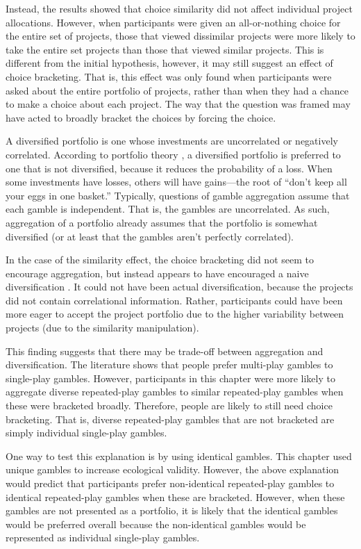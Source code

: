 \documentclass[a4paper, nobind]{templates/ociamthesis}
\theoremstyle{definition}
\theoremstyle{definition}
\theoremstyle{definition}
\theoremstyle{definition}
\theoremstyle{remark}
\begin{document}
Instead, the results showed that choice similarity did not affect individual
project allocations. However, when participants were given an all-or-nothing
choice for the entire set of projects, those that viewed dissimilar projects
were more likely to take the entire set projects than those that viewed similar
projects. This is different from the initial hypothesis, however, it may still
suggest an effect of choice bracketing. That is, this effect was only found when
participants were asked about the entire portfolio of projects, rather than when
they had a chance to make a choice about each project. The way that the question
was framed may have acted to broadly bracket the choices by forcing the choice.

A diversified portfolio is one whose investments are uncorrelated or negatively
correlated. According to portfolio theory \autocite{markowitz1952}, a diversified
portfolio is preferred to one that is not diversified, because it reduces the
probability of a loss. When some investments have losses, others will have
gains---the root of ``don't keep all your eggs in one basket.'' Typically,
questions of gamble aggregation assume that each gamble is independent. That is,
the gambles are uncorrelated. As such, aggregation of a portfolio already
assumes that the portfolio is somewhat diversified (or at least that the gambles
aren't perfectly correlated).

In the case of the similarity effect, the choice bracketing did not seem to
encourage aggregation, but instead appears to have encouraged a naive
diversification \autocite{hedesstrom2006,read1995}. It could not have been actual
diversification, because the projects did not contain correlational information.
Rather, participants could have been more eager to accept the project portfolio
due to the higher variability between projects (due to the similarity
manipulation).

This finding suggests that there may be trade-off between aggregation and
diversification. The literature shows that people prefer multi-play gambles to
single-play gambles. However, participants in this chapter were more likely to
aggregate diverse repeated-play gambles to similar repeated-play gambles when
these were bracketed broadly. Therefore, people are likely to still need choice
bracketing. That is, diverse repeated-play gambles that are not bracketed are
simply individual single-play gambles.

One way to test this explanation is by using identical gambles. This chapter
used unique gambles to increase ecological validity. However, the above
explanation would predict that participants prefer non-identical repeated-play
gambles to identical repeated-play gambles when these are bracketed. However,
when these gambles are not presented as a portfolio, it is likely that the
identical gambles would be preferred overall because the non-identical gambles
would be represented as individual single-play gambles.
\end{document}
